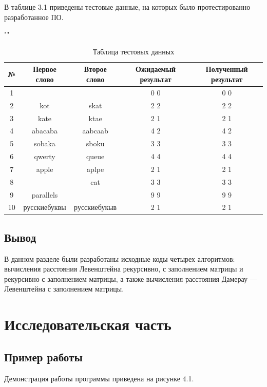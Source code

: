 \documentclass[12pt]{report}
\begin{document}
В таблице 3.1 приведены тестовые данные, на которых было протестированно разработанное ПО.

\begin{table}[h]
	\begin{center}
		\caption{Таблица тестовых данных}
		""\newline
		\begin{tabular}{|c c c c c|} 
			\hline
			№ & Первое слово & Второе слово & Ожидаемый результат & Полученный результат \\ [0.8ex] 
			\hline
			1 &  &  & 0 0 & 0 0\\
			\hline
			2 & kot & skat & 2 2 & 2 2\\
			\hline
			3 & kate & ktae & 2 1 & 2 1\\
			\hline
			4 & abacaba & aabcaab & 4 2 & 4 2\\
			\hline
			5 & sobaka & sboku & 3 3 & 3 3\\
			\hline
			6 & qwerty & queue & 4 4 & 4 4\\
			\hline
			7 & apple & aplpe & 2 1  & 2 1\\
			\hline
			8 &  & cat & 3 3 & 3 3\\
			\hline
			9 & parallels &  & 9 9 & 9 9\\
			\hline
			10 & русскиебуквы & русскиебукыв & 2 1 & 2 1\\
			\hline
		\end{tabular}
	\end{center}
\end{table}

\section{Вывод}
В данном разделе были разработаны исходные коды четырех алгоритмов: вычисления расстояния Левенштейна рекурсивно, с заполнением матрицы и рекурсивно с заполнением матрицы, а также вычисления расстояния Дамерау — Левенштейна с заполнением матрицы.

\chapter{Исследовательская часть}

\section{Пример работы}

Демонстрация работы программы приведена на рисунке 4.1.
\end{document}
